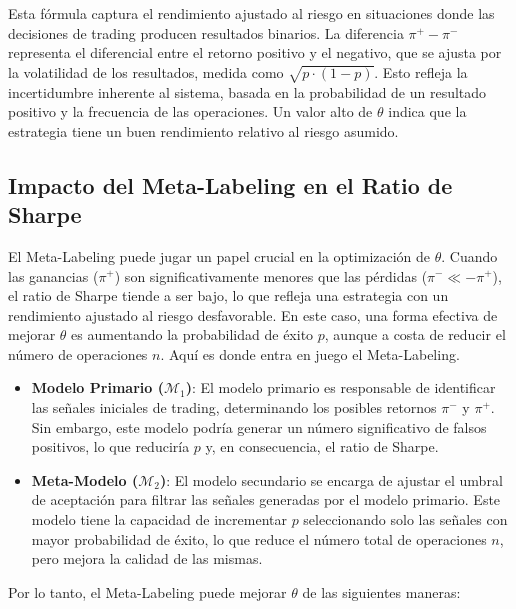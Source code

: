 \documentclass[a4paper,12pt, twoside]{report}
\begin{document}
Esta fórmula captura el rendimiento ajustado al riesgo en situaciones donde las 
decisiones de trading producen resultados binarios. La diferencia $\pi^+ - \pi^-$ 
representa el diferencial entre el retorno positivo y el negativo, que se ajusta 
por la volatilidad de los resultados, medida como $\sqrt{p \cdot (1 - p)}$. Esto 
refleja la incertidumbre inherente al sistema, basada en la probabilidad de un 
resultado positivo y la frecuencia de las operaciones.
Un valor alto de $\theta$ indica que la estrategia tiene un buen rendimiento 
relativo al riesgo asumido.



\subsection{Impacto del Meta-Labeling en el Ratio de Sharpe}

El Meta-Labeling puede jugar un papel crucial en la optimización de $\theta$. Cuando 
las ganancias ($\pi^+$) son significativamente menores que las pérdidas ($\pi^- \ll -\pi^+$), 
el ratio de Sharpe tiende a ser bajo, lo que refleja una estrategia con un rendimiento 
ajustado al riesgo desfavorable. En este caso, una forma efectiva de 
mejorar $\theta$ es aumentando la probabilidad de éxito $p$, aunque a costa de 
reducir el número de operaciones $n$. Aquí es donde entra en juego el Meta-Labeling.

\begin{itemize}
    \item \textbf{Modelo Primario ($\mathcal{M}_1$)}: El modelo primario es responsable de identificar 
    las señales iniciales de trading, determinando los posibles retornos $\pi^-$ y $\pi^+$. Sin embargo, 
    este modelo podría generar un número significativo de falsos positivos, lo que reduciría $p$ y, en 
    consecuencia, el ratio de Sharpe.
    
    \item \textbf{Meta-Modelo ($\mathcal{M}_2$)}: El modelo secundario se encarga de ajustar el umbral 
    de aceptación para filtrar las señales generadas por el modelo primario. Este modelo tiene la 
    capacidad de incrementar $p$ seleccionando solo las señales con mayor probabilidad de éxito, 
    lo que reduce el número total de operaciones $n$, pero mejora la calidad de las mismas.
\end{itemize}

Por lo tanto, el Meta-Labeling puede mejorar \(\theta\) de las siguientes maneras:
\end{document}

